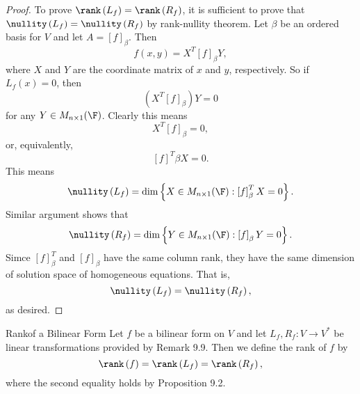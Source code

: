 \documentclass[linearalgebra]{subfiles}
\begin{document}
    \begin{proof}
        To prove $\rank\left( L_f \right) = \rank\left( R_f \right)$, it is sufficient to prove that $\nullity\left( L_f \right) = \nullity\left( R_f \right)$ by rank-nullity theorem. Let $\beta$ be an ordered basis for $V$ and let $A=\left[ f \right] _\beta$. Then
        \begin{equation*}
            f\left( x,y \right) = X^T\left[ f \right] _\beta Y,
        \end{equation*}
        where $X$ and $Y$ are the coordinate matrix of $x$ and $y$, respectively. So if $L_f(x)=0$, then
        \begin{equation*}
            \left( X^T\left[ f \right] _\beta \right) Y = 0
        \end{equation*}
        for any $Y\in M_{n\times 1}(\F)$. Clearly this means
        \begin{equation*}
            X^T\left[ f \right] _\beta = 0,
        \end{equation*}
        or, equivalently,
        \begin{equation*}
            \left[ f \right] ^T\beta X = 0.
        \end{equation*}
        This means
        \begin{equation*}
            \nullity\left( L_f \right) = \dim \left\lbrace X\in M_{n\times 1}(\F): \left[ f \right] ^T_\beta X = 0  \right\rbrace  .
        \end{equation*}
        Similar argument shows that
        \begin{equation*}
            \nullity\left( R_f \right) = \dim\left\lbrace Y\in M_{n\times 1}(\F): \left[ f \right] _\beta Y = 0  \right\rbrace .
        \end{equation*}
        Simce $\left[ f \right] ^T_\beta$ and $\left[ f \right] _\beta$ have the same column rank, they have the same dimension of solution space of homogeneous equations. That is,
        \begin{equation*}
            \nullity\left( L_f \right) = \nullity\left( R_f \right),
        \end{equation*}
        as desired.
    \end{proof}

    \begin{definition}{Rank}{of a Bilinear Form}
        Let $f$ be a bilinear form on $V$ and let $L_f, R_f: V\to V^*$ be linear transformations provided by Remark 9.9. Then we define the rank of $f$ by
        \begin{equation*}
            \rank\left( f \right) = \rank\left( L_f \right) = \rank\left( R_f \right),
        \end{equation*}
        where the second equality holds by Proposition 9.2.
    \end{definition}
\end{document}
